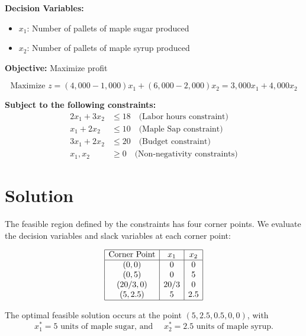 \documentclass[12pt]{article}
\begin{document}
\pagebreak

\textbf{Decision Variables:}
\begin{itemize}
    \item $x_1$: Number of pallets of  maple sugar produced
    \item $x_2$: Number of pallets of  maple syrup produced
\end{itemize}

\textbf{Objective:} Maximize profit

\[
\text{Maximize } z = (4,000 - 1,000)x_1 + (6,000-2,000)x_2 = 3,000x_1+4,000x_2
\]

\textbf{Subject to the following constraints:}
\[
\begin{aligned}
2x_1 + 3x_2 &\leq 18 \quad \text{(Labor hours constraint)} \\
x_1 + 2x_2 &\leq 10 \quad \text{(Maple Sap constraint)} \\
3x_1 + 2x_2 &\leq 20 \quad \text{(Budget constraint)} \\
x_1, x_2 &\geq 0 \quad \text{(Non-negativity constraints)}
\end{aligned}
\]



\section*{Solution}

The feasible region defined by the constraints has four corner points. We evaluate the decision variables and slack variables at each corner point:

\[
\begin{array}{|c|c|c|}
\hline
\text{Corner Point} & x_1 & x_2 \\%
\hline
(0, 0) & 0 & 0 \\%
(0, 5) & 0 & 5 \\%
(20/3,0 ) & 20/3 & 0 \\%
(5, 2.5) & 5 & 2.5 \\%
\hline
\end{array}
\]


The optimal feasible solution occurs at the point \( (5, 2.5, 0.5,0,0) \), with
\[
x_1^* = 5 \textrm{ units of maple sugar, and } \quad x_2^* = 2.5 \textrm{ units of maple syrup.}
\]
\end{document}

